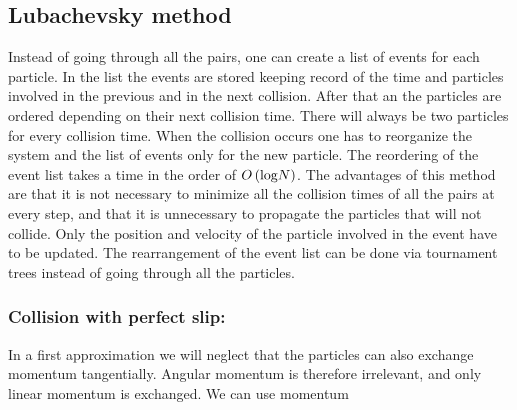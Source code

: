 \subsection{Lubachevsky method}

Instead of going through all the pairs, one can create a list of events for each particle. In the list the events are stored keeping record of the time and particles involved in the previous and in the next  collision. After that an the particles are ordered depending on their next collision time. There will always be two particles for every collision time. When the collision occurs one has to reorganize  the system and the list of events only for the new particle. The reordering of the event list takes a time in the order of $O\left(\text{log}N\right)$. The advantages of this method are that it is not necessary to minimize all the collision times of all the pairs at every step, and that it is unnecessary to propagate the particles that will not collide. Only the position and velocity of the particle involved in the event have to be updated. The rearrangement of the event list can be done via tournament trees instead of going through all the particles.



\subsubsection*{Collision with perfect slip:}

In a first approximation we will neglect that the particles can also exchange momentum tangentially. Angular momentum is therefore irrelevant, and only linear momentum is exchanged. We can use momentum 

